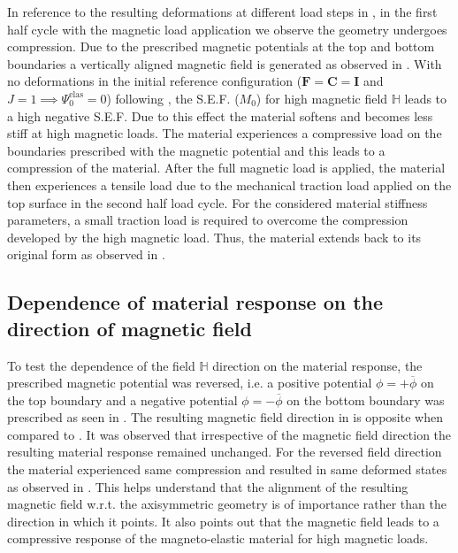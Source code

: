 In reference to the resulting deformations at different load steps in , in the first half cycle with the magnetic load application we observe the geometry undergoes compression. Due to the prescribed magnetic potentials at the top and bottom boundaries a vertically aligned magnetic field is generated as observed in . With no deformations in the initial reference configuration ($\mathbf{F} = \mathbf{C} = \mathbf{I}$ and $J = 1 \implies \Psi_0^{\text{elas}} = 0$) following , the S.E.F. ($M_0$) for high magnetic field $\mathbb{H}$ leads to a high negative S.E.F. Due to this effect the material softens and becomes less stiff at high magnetic loads. The material experiences a compressive load on the boundaries prescribed with the magnetic potential and this leads to a compression of the material. After the full magnetic load is applied, the material then experiences a tensile load due to the mechanical traction load applied on the top surface in the second half load cycle. For the considered material stiffness parameters, a small traction load is required to overcome the compression developed by the high magnetic load. Thus, the material extends back to its original form as observed in . \par 

\subsection{Dependence of material response on the direction of magnetic field}
To test the dependence of the field $\mathbb{H}$ direction on the material response, the prescribed magnetic potential was reversed, i.e. a positive potential $\phi = +\overline{\phi}$ on the top boundary and a negative potential $\phi = -\overline{\phi}$ on the bottom boundary was prescribed as seen in . The resulting magnetic field direction in  is opposite when compared to . It was observed that irrespective of the magnetic field direction the resulting material response remained unchanged. For the reversed field direction the material experienced same compression and resulted in same deformed states as observed in . This helps understand that the alignment of the resulting magnetic field w.r.t. the axisymmetric geometry is of importance rather than the direction in which it points. It also points out that the magnetic field leads to a compressive response of the magneto-elastic material for high magnetic loads. \par 

